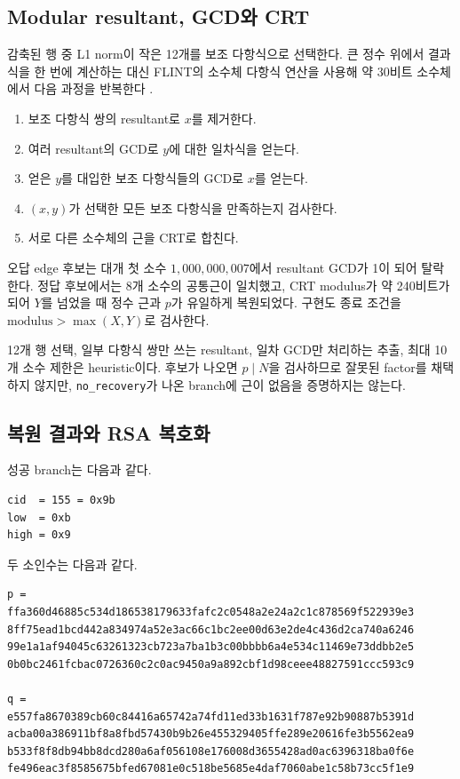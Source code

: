 \documentclass[10pt,a4paper]{article}
\begin{document}
\subsection{Modular resultant, GCD와 CRT}

감축된 행 중 L1 norm이 작은 12개를 보조 다항식으로 선택한다. 큰 정수
위에서 결과식을 한 번에 계산하는 대신 FLINT의 소수체 다항식 연산을
사용해 약 30비트 소수체에서 다음 과정을 반복한다 \cite{flint}.

\begin{enumerate}
  \item 보조 다항식 쌍의 resultant로 \(x\)를 제거한다.
  \item 여러 resultant의 GCD로 \(y\)에 대한 일차식을 얻는다.
  \item 얻은 \(y\)를 대입한 보조 다항식들의 GCD로 \(x\)를 얻는다.
  \item \((x,y)\)가 선택한 모든 보조 다항식을 만족하는지 검사한다.
  \item 서로 다른 소수체의 근을 CRT로 합친다.
\end{enumerate}

오답 edge 후보는 대개 첫 소수 \(1{,}000{,}000{,}007\)에서 resultant
GCD가 1이 되어 탈락한다. 정답 후보에서는 8개 소수의 공통근이 일치했고,
CRT modulus가 약 240비트가 되어 \(Y\)를 넘었을 때 정수 근과 \(p\)가
유일하게 복원되었다. 구현도 종료 조건을
\(\mathrm{modulus}>\max(X,Y)\)로 검사한다.

12개 행 선택, 일부 다항식 쌍만 쓰는 resultant, 일차 GCD만 처리하는
추출, 최대 10개 소수 제한은 heuristic이다. 후보가 나오면
\(p\mid N\)을 검사하므로 잘못된 factor를 채택하지 않지만,
\texttt{no\_recovery}가 나온 branch에 근이 없음을 증명하지는 않는다.

\subsection{복원 결과와 RSA 복호화}

성공 branch는 다음과 같다.

\begin{lstlisting}
cid  = 155 = 0x9b
low  = 0xb
high = 0x9
\end{lstlisting}

두 소인수는 다음과 같다.

\begin{lstlisting}
p =
ffa360d46885c534d186538179633fafc2c0548a2e24a2c1c878569f522939e3
8ff75ead1bcd442a834974a52e3ac66c1bc2ee00d63e2de4c436d2ca740a6246
99e1a1af94045c63261323cb723a7ba1b3c00bbbb6a4e534c11469e73ddbb2e5
0b0bc2461fcbac0726360c2c0ac9450a9a892cbf1d98ceee48827591ccc593c9

q =
e557fa8670389cb60c84416a65742a74fd11ed33b1631f787e92b90887b5391d
acba00a386911bf8a8fbd57430b9b26e455329405ffe289e20616fe3b5562ea9
b533f8f8db94bb8dcd280a6af056108e176008d3655428ad0ac6396318ba0f6e
fe496eac3f8585675bfed67081e0c518be5685e4daf7060abe1c58b73cc5f1e9
\end{lstlisting}
\end{document}
